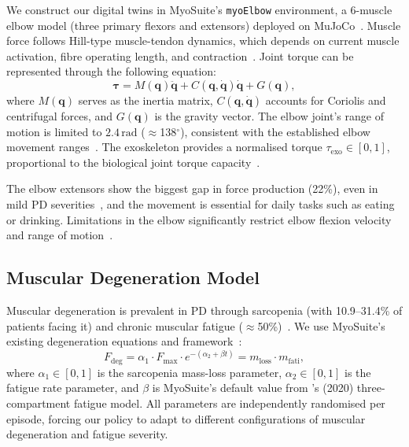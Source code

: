 \documentclass[letterpaper]{article} %
\begin{document}
We construct our digital twins in MyoSuite's \texttt{myoElbow} environment, a
6-muscle elbow model (three primary flexors and extensors) deployed on
MuJoCo~\citep{caggiano2022}.
Muscle force follows Hill-type muscle-tendon dynamics, which depends on current
muscle activation, fibre operating length, and
contraction~\citep{zajac1989}.
Joint torque can be represented through the following equation:
\begin{equation}
  \boldsymbol{\tau} = M(\mathbf{q})\ddot{\mathbf{q}}
    + C(\mathbf{q}, \dot{\mathbf{q}})\dot{\mathbf{q}}
    + G(\mathbf{q}),
  \label{eq:torque}
\end{equation}
where $M(\mathbf{q})$ serves as the inertia matrix,
$C(\mathbf{q}, \dot{\mathbf{q}})$ accounts for Coriolis and centrifugal forces,
and $G(\mathbf{q})$ is the gravity vector.
The elbow joint's range of motion is limited to $2.4\,\mathrm{rad}$
($\approx$138$^\circ$), consistent with the established elbow movement
ranges~\citep{cools2017, morrey1981}.
The exoskeleton provides a normalised torque
$\tau_\text{exo}\in[0,1]$, proportional to the biological joint torque
capacity~\citep{durandau2019}.

The elbow extensors show the biggest gap in force production (22\%), even in
mild PD severities~\citep{ingram2021}, and the movement is essential for daily
tasks such as eating or drinking.
Limitations in the elbow significantly restrict elbow flexion velocity and range
of motion~\citep{caligiuri2018}.

\subsection{Muscular Degeneration Model}

Muscular degeneration is prevalent in PD through sarcopenia (with 10.9--31.4\%
of patients facing it) and chronic muscular fatigue
($\approx$50\%)~\citep{hart2023, ponsoni2023, siciliano2024}.
We use MyoSuite's existing degeneration equations and
framework~\citep{caggiano2022}:
\begin{equation}
  F_\text{deg} = \alpha_1 \cdot F_\text{max}
    \cdot e^{-(\alpha_2 + \beta t)}
    = m_\text{loss} \cdot m_\text{fati},
  \label{eq:degeneration}
\end{equation}
where $\alpha_1\in[0,1]$ is the sarcopenia mass-loss parameter,
$\alpha_2\in[0,1]$ is the fatigue rate parameter, and $\beta$ is MyoSuite's
default value from \citeauthor{caggiano2022}'s (2020) three-compartment fatigue
model.
All parameters are independently randomised per episode, forcing our policy to
adapt to different configurations of muscular degeneration and fatigue severity.
\end{document}
